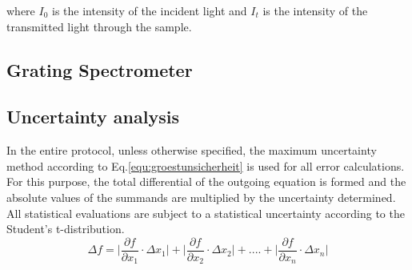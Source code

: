     where 
    $I_0$ is the intensity of the incident light and
    $I_t$ is the intensity of the transmitted light through the sample.

\subsection{Grating Spectrometer}





\subsection{Uncertainty analysis}
\label{sec:unsichi}

In the entire protocol, unless otherwise specified, the maximum uncertainty method according to Eq.\ref{equ:groestunsicherheit} \cite{MMETH} is used for all error calculations.
For this purpose, the total differential of the outgoing equation is formed and the absolute values of the summands are multiplied by the uncertainty determined.
All statistical evaluations are subject to a statistical uncertainty according to the Student's t-distribution.
\begin{equation}
    \varDelta f = \biggl| \frac{\partial f}{\partial x_{1}} \cdot \varDelta x_{1} \biggl| + \biggl| \frac{\partial f}{\partial x_{2}} \cdot \varDelta x_{2} \biggl| + .... + \biggl| \frac{\partial f}{\partial x_{n}} \cdot \varDelta x_{n} \biggl|
    \label{equ:groestunsicherheit}
\end{equation}
\newpage